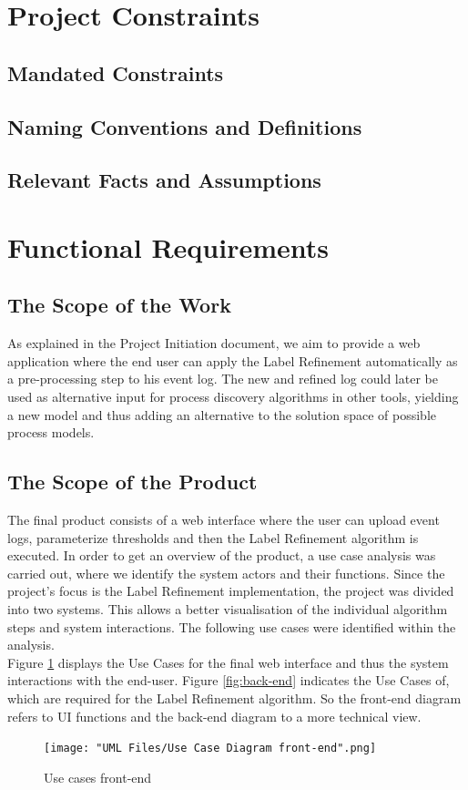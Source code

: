 \documentclass[notitlepage]{article}
\begin{document}
\begin{flushleft}
\section{Project Constraints}

\subsection{Mandated Constraints}

\subsection{Naming Conventions and Definitions}

\subsection{Relevant Facts and Assumptions}


\section{Functional Requirements}

\subsection{The Scope of the Work}
As explained in the Project Initiation document, we aim to provide a web application where the end user can apply the Label Refinement automatically as a pre-processing step to his event log.
The new and refined log could later be used as alternative input for process discovery algorithms in other tools, yielding a new model and thus adding an alternative to the solution space of possible process models.


\subsection{The Scope of the Product}
The final product consists of a web interface where the user can upload event logs, parameterize thresholds and then the Label Refinement algorithm is executed. 
In order to get an overview of the product, a use case analysis was carried out, where we identify the system actors and their functions. 
Since the project's focus is the Label Refinement implementation, the project was divided into two systems. 
This allows a better visualisation of the individual algorithm steps and system interactions. The following use cases were identified within the analysis.\\
\medskip
Figure \ref{fig:front-end} displays the Use Cases for the final web interface and thus the system interactions with the end-user.  
Figure \ref{fig:back-end} indicates the Use Cases of, which are required for the Label Refinement algorithm. So the front-end diagram refers to UI functions  
and the back-end diagram to a more technical view.
\begin{figure}[h!]
  \texttt{[image: "UML Files/Use Case Diagram front-end".png]}
  \caption{Use cases front-end}
  \label{fig:front-end}
\end{figure}


\end{flushleft}
\end{document}
